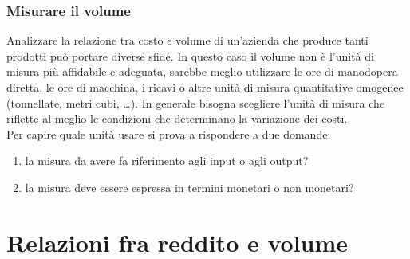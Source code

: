 \documentclass{article}
\begin{document}
\subsubsection{Misurare il volume}
Analizzare la relazione tra costo e volume di un'azienda che produce tanti prodotti può portare diverse sfide. In questo caso il volume non è l'unità di misura più affidabile e adeguata, sarebbe meglio utilizzare le ore di manodopera diretta, le ore di macchina, i ricavi o altre unità di misura quantitative omogenee (tonnellate, metri cubi, \dots). In generale bisogna scegliere l'unità di misura che riflette al meglio le condizioni che determinano la variazione dei costi.\\
Per capire quale unità usare si prova a rispondere a due domande:
\begin{enumerate}
    \item la misura da avere fa riferimento agli input o agli output?
    \item la misura deve essere espressa in termini monetari o non monetari?
\end{enumerate}









\section{Relazioni fra reddito e volume}
\end{document}
